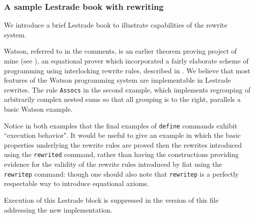 \documentclass[12pt]{article}
\begin{document}
\newpage



\subsubsection{A sample Lestrade book with rewriting}

We introduce a brief Lestrade book to illustrate capabilities of the rewrite system.

Watson, referred to in the comments,  is an earlier theorem proving project of mine (see \cite{watson}), an equational prover which incorporated a fairly elaborate scheme of programming using interlocking rewrite rules, described in \cite{holmesrewriting}.  We believe that most features of the Watson programming system are implementable in Lestrade rewrites.  The rule {\tt Assocs} in the second example, which implements regrouping of arbitrarily complex nested sums so that all grouping is to the right, parallels a basic Watson example.

Notice in both examples that the final examples of {\tt define} commands exhibit ``execution behavior".  It would be useful to give an example in which the basic properties
underlying the rewrite rules are proved then the rewrites introduced using the {\tt rewrited} command, rather than having the constructions providing evidence for the validity of the rewrite rules introduced by fiat using the {\tt rewritep} command:  though one should also note that {\tt rewritep} is a perfectly respectable way to introduce equational axioms.

Execution of this Lestrade block is suppressed in the version of this file addressing the new implementation.
\end{document}
